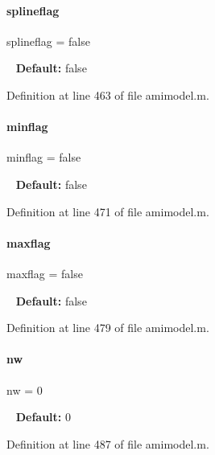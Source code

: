\paragraph{\texorpdfstring{splineflag}{splineflag}}
{\footnotesize\ttfamily splineflag = false}

~\newline
{\bfseries{Default\+:}} false 

Definition at line 463 of file amimodel.\+m.

\mbox{\label{classamimodel_affead4b7a87bc135fea91fd5aada78a8}} 
\paragraph{\texorpdfstring{minflag}{minflag}}
{\footnotesize\ttfamily minflag = false}

~\newline
{\bfseries{Default\+:}} false 

Definition at line 471 of file amimodel.\+m.

\mbox{\label{classamimodel_a1a65e7157ae2262cfa11a783b018364f}} 
\paragraph{\texorpdfstring{maxflag}{maxflag}}
{\footnotesize\ttfamily maxflag = false}

~\newline
{\bfseries{Default\+:}} false 

Definition at line 479 of file amimodel.\+m.

\mbox{\label{classamimodel_a371815f74d602ff1338376abbd1278e4}} 
\paragraph{\texorpdfstring{nw}{nw}}
{\footnotesize\ttfamily nw = 0}

~\newline
{\bfseries{Default\+:}} 0 

Definition at line 487 of file amimodel.\+m.

